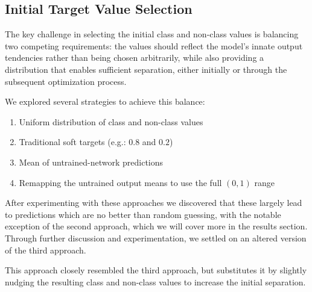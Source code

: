 \documentclass[12pt,fleqn,a4paper]{article}
\begin{document}
\subsection{Initial Target Value Selection}
The key challenge in selecting the initial class and non-class values is balancing two competing requirements: the values should reflect the model's innate output tendencies rather than being chosen arbitrarily, while also providing a distribution that enables sufficient separation, either initially or through the subsequent optimization process.

We explored several strategies to achieve this balance:
\begin{enumerate}
    \item Uniform distribution of class and non-class values
    \item Traditional soft targets (e.g.: $0.8$ and $0.2$)
    \item Mean of untrained-network predictions
    \item Remapping the untrained output means to use the full $(0,1)$ range
\end{enumerate}

After experimenting with these approaches we discovered that these largely lead to predictions which are no better than random guessing, with the notable exception of the second approach, which we will cover more in the results section. Through further discussion and experimentation, we settled on an altered version of the third approach. 

\vspace{2em}
This approach closely resembled the third approach, but substitutes it by slightly nudging the resulting class and non-class values to increase the initial separation. 
\end{document}
